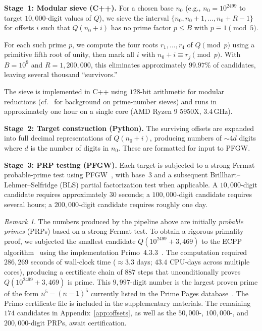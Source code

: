 \documentclass[11pt,a4paper]{article}
\theoremstyle{plain}
\theoremstyle{definition}
\theoremstyle{remark}
\newtheorem{remark}[theorem]{Remark}
\begin{document}
\medskip
\noindent\textbf{Stage~1: Modular sieve (C++).}
For a chosen base $n_0$ (e.g., $n_0 = 10^{2499}$ to target $10{,}000$-digit values of $Q$), we sieve the interval $\{n_0, n_0{+}1, \ldots, n_0{+}R-1\}$ for offsets $i$ such that $Q(n_0 + i)$ has no prime factor $p \le B$ with $p \equiv 1 \pmod{5}$.

For each such prime $p$, we compute the four roots $r_1, \ldots, r_4$ of $Q \pmod{p}$ using a primitive fifth root of unity, then mark all $i$ with $n_0 + i \equiv r_j \pmod{p}$. With $B = 10^9$ and $R = 1{,}200{,}000$, this eliminates approximately $99.97\%$ of candidates, leaving several thousand ``survivors.''

The sieve is implemented in C++ using $128$-bit arithmetic for modular reductions (cf.~\cite{pritchard1987,sorenson1998} for background on prime-number sieves) and runs in approximately one hour on a single core (AMD Ryzen 9 5950X, 3.4\,GHz).

\medskip
\noindent\textbf{Stage~2: Target construction (Python).}
The surviving offsets are expanded into full decimal representations of $Q(n_0 + i)$, producing numbers of $\sim 4d$ digits where $d$ is the number of digits in $n_0$. These are formatted for input to PFGW.

\medskip
\noindent\textbf{Stage~3: PRP testing (PFGW).}
Each target is subjected to a strong Fermat probable-prime test using PFGW~\cite{pfgw}, with base~$3$ and a subsequent Brillhart--Lehmer--Selfridge (BLS) partial factorization test when applicable. A $10{,}000$-digit candidate requires approximately $30$ seconds; a $100{,}000$-digit candidate requires several hours; a $200{,}000$-digit candidate requires roughly one day.

\begin{remark}
The numbers produced by the pipeline above are initially \emph{probable primes} (PRPs) based on a strong Fermat test.  To obtain a rigorous primality proof, we subjected the smallest candidate $Q(10^{2499} + 3{,}469)$ to the ECPP algorithm~\cite{atkinmorain1993} using the implementation Primo~4.3.3~\cite{primo}. The computation required $286{,}269$ seconds of wall-clock time ($\approx 3.3$ days; $43.4$ CPU-days across multiple cores), producing a certificate chain of $887$ steps that unconditionally proves $Q(10^{2499} + 3{,}469)$ is prime. This $9{,}997$-digit number is the largest proven prime of the form $n^5 - (n-1)^5$ currently listed in the Prime Pages database~\cite{primepages}. The Primo certificate file is included in the supplementary materials. The remaining $174$ candidates in Appendix~\ref{app:offsets}, as well as the $50{,}000$-, $100{,}000$-, and $200{,}000$-digit PRPs, await certification.
\end{remark}
\end{document}
